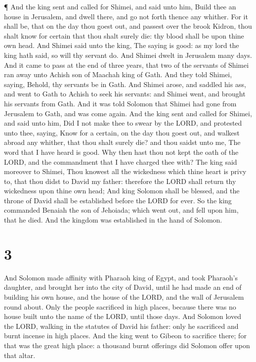  ¶ And the king sent and called for Shimei, and said unto
him, Build thee an house in Jerusalem, and dwell there, and go not forth
thence any whither.  For it shall be, that on the day thou
goest out, and passest over the brook Kidron, thou shalt know for
certain that thou shalt surely die: thy blood shall be upon thine own
head.  And Shimei said unto the king, The saying is good:
as my lord the king hath said, so will thy servant do. And Shimei dwelt
in Jerusalem many days.  And it came to pass at the end of
three years, that two of the servants of Shimei ran away unto Achish son
of Maachah king of Gath. And they told Shimei, saying, Behold, thy
servants be in Gath.  And Shimei arose, and saddled his
ass, and went to Gath to Achish to seek his servants: and Shimei went,
and brought his servants from Gath.  And it was told
Solomon that Shimei had gone from Jerusalem to Gath, and was come again.
 And the king sent and called for Shimei, and said unto
him, Did I not make thee to swear by the LORD, and protested unto thee,
saying, Know for a certain, on the day thou goest out, and walkest
abroad any whither, that thou shalt surely die? and thou saidst unto me,
The word that I have heard is good.  Why then hast thou not
kept the oath of the LORD, and the commandment that I have charged thee
with?  The king said moreover to Shimei, Thou knowest all
the wickedness which thine heart is privy to, that thou didst to David
my father: therefore the LORD shall return thy wickedness upon thine own
head;  And king Solomon shall be blessed, and the throne of
David shall be established before the LORD for ever.  So
the king commanded Benaiah the son of Jehoiada; which went out, and fell
upon him, that he died. And the kingdom was established in the hand of
Solomon.

\hypertarget{section-2}{%
\section{3}\label{section-2}}

 And Solomon made affinity with Pharaoh king of Egypt, and
took Pharaoh's daughter, and brought her into the city of David, until
he had made an end of building his own house, and the house of the LORD,
and the wall of Jerusalem round about.  Only the people
sacrificed in high places, because there was no house built unto the
name of the LORD, until those days.  And Solomon loved the
LORD, walking in the statutes of David his father: only he sacrificed
and burnt incense in high places.  And the king went to
Gibeon to sacrifice there; for that was the great high place: a thousand
burnt offerings did Solomon offer upon that altar.

